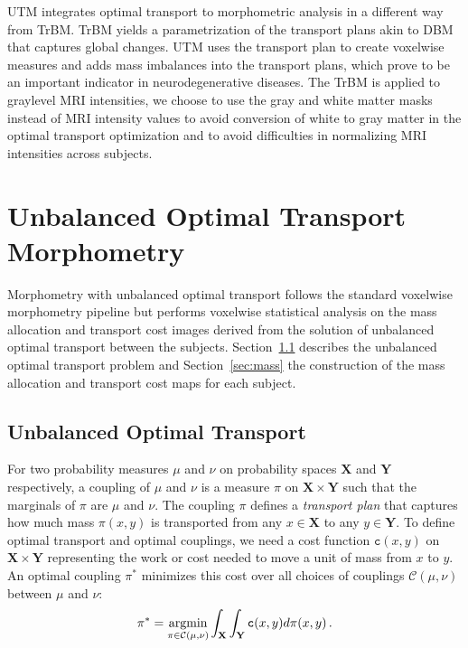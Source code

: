 \documentclass{llncs}
\newcommand{\cost}[0]{\mathtt{c}}
\newcommand{\coupling}[0]{\pi}
\def\argmin{\mathop{\rm argmin}}
\newcommand{\Xsp}{{\mathbf{X}}}
\newcommand{\Ysp}{{\mathbf{Y}}}
\begin{document}
UTM integrates optimal transport to morphometric analysis in a different way
from TrBM.  TrBM yields a parametrization of the transport plans akin to DBM
that captures global changes. UTM uses the transport plan to create voxelwise
measures and adds mass imbalances into the transport plans, which prove to be
an important indicator in neurodegenerative diseases.  The TrBM is applied to
graylevel MRI intensities, we choose to use the gray and white matter masks
instead of MRI intensity values to avoid conversion of white to gray matter in
the optimal transport optimization and to avoid difficulties in normalizing MRI
intensities across subjects. 


\section{Unbalanced Optimal Transport Morphometry}
\label{sec:methods}
Morphometry with unbalanced optimal transport follows the standard voxelwise
morphometry pipeline but performs voxelwise statistical analysis on the mass
allocation and transport cost images derived from the solution of unbalanced
optimal transport between the subjects. Section~\ref{sec:unbalanced} describes
the unbalanced optimal transport problem and Section~\ref{sec:mass} the
construction of the mass allocation and transport cost maps for each subject.

\subsection{Unbalanced Optimal Transport}
\label{sec:unbalanced}
For two probability measures $\mu$ and $\nu$ on probability spaces ${\Xsp}$
and ${\Ysp}$ respectively, a coupling of $\mu$ and $\nu$ is a measure
$\coupling$ on ${\Xsp}\times{\Ysp}$ such that the marginals of $\coupling$ are
$\mu$ and $\nu$. The coupling $\coupling$ defines a {\em transport plan} that
captures how much mass $\coupling(x, y)$ is transported from any $x \in \Xsp$
to any $y \in \Ysp$. To define optimal transport and optimal couplings, we need
a cost function $\cost(x,y)$ on ${\Xsp}\times{\Ysp}$ representing the work or
cost needed to move a unit of mass from $x$ to $y$. An optimal coupling
$\coupling^*$ minimizes this cost over all choices of couplings
$\mathcal{C}(\mu,\nu)$ between
$\mu$ and $\nu$: 
\begin{equation}
  \coupling^*= \argmin_{\coupling\in\mathcal{C}(\mu,\nu)} \int_{{\Xsp}}\int_{{\Ysp}}
\cost(x,y)  d\coupling(x,y) \,.  
\end{equation}
\end{document}

